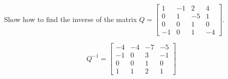 
\begin{exerciseStatement}


Show how to find the inverse of the matrix \(Q= \left[\begin{array}{cccc}
1 & -1 & 2 & 4 \\
0 & 1 & -5 & 1 \\
0 & 0 & 1 & 0 \\
-1 & 0 & 1 & -4
\end{array}\right] \).


\end{exerciseStatement}
    
\begin{exerciseAnswer} 
\[Q^{-1}= \left[\begin{array}{cccc}
-4 & -4 & -7 & -5 \\
-1 & 0 & 3 & -1 \\
0 & 0 & 1 & 0 \\
1 & 1 & 2 & 1
\end{array}\right] \]
\end{exerciseAnswer}
    
